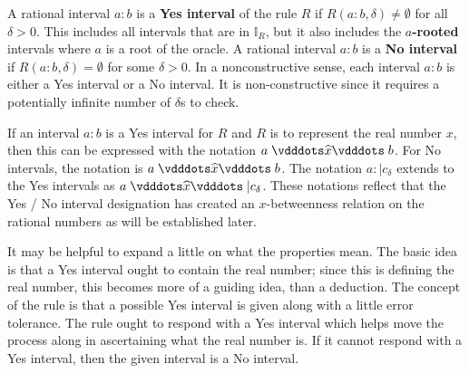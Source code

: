 \documentclass[12pt]{article}
\begin{document}
A rational interval $a:b$ is a \textbf{Yes interval} of the rule $R$ if $R(a:b, \delta) \neq \emptyset$ for all $\delta >0$. This includes all intervals that are in  $\mathbb{I}_R$, but it also includes the \textbf{$a$-rooted} intervals where $a$ is a root of the oracle.   A rational interval $a:b$ is a \textbf{No interval} if $R(a:b, \delta) = \emptyset$ for some $\delta > 0$. In a nonconstructive sense, each interval $a:b$ is either a Yes interval or a No interval. It is non-constructive since it requires a potentially infinite number of $\delta$s to check. 

If an interval $a:b$ is a Yes interval for $R$ and $R$ is to represent the real number $x$, then this can be expressed with the notation $a \xora b$. For No intervals, the notation is \sout{$a \xora b$}. The notation $a:|c_\delta$ extends to the Yes intervals as $a \xora |c_\delta$. These notations reflect that the Yes / No interval designation has created an $x$-betweenness relation on the rational numbers as will be established later.

It may be helpful to expand a little on what the properties mean. The basic idea is that a Yes interval ought to contain the real number; since this is defining the real number, this becomes more of a guiding idea, than a deduction. The concept of the rule is that a possible Yes interval is given along with a little error tolerance. The rule ought to respond with a Yes interval which helps move the process along in ascertaining what the real number is. If it cannot respond with a Yes interval, then the given interval is a No interval. 
\end{document}
